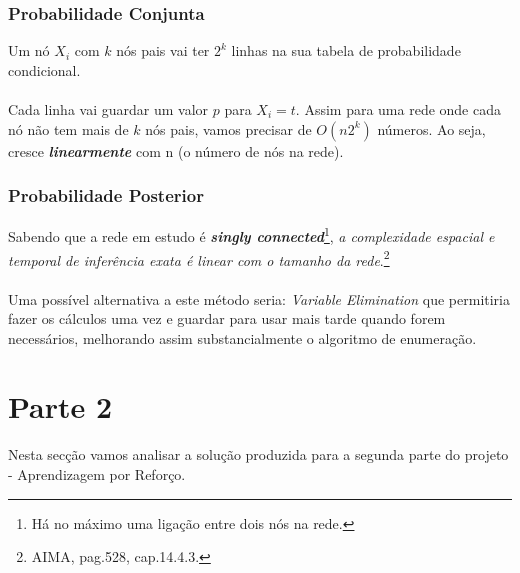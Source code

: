 \documentclass[9pt, a4paper, twocolumn]{article}
\begin{document}
\subsubsection{Probabilidade Conjunta}
Um nó $X_{i}$ com $k$ nós pais vai ter $2^k$ linhas na sua
tabela de probabilidade condicional.\\
\\
Cada linha vai guardar um valor $p$ para $X_{i}=t$. Assim para uma rede onde
 cada nó não tem mais de $k$ nós pais, vamos precisar de $O(n2^k)$ números.
Ao seja, cresce \textbf{\emph{linearmente}} com n (o número de nós na rede).
\subsubsection{Probabilidade Posterior}
Sabendo que a rede em estudo é \textit{\textbf{singly connected}}\footnote{Há no máximo uma ligação entre dois nós na rede.}, \textit{a complexidade espacial e temporal de inferência exata é linear com o tamanho da rede}.\footnote{AIMA, pag.528, cap.14.4.3.}\\\\
Uma possível alternativa a este método seria: \textit{Variable Elimination} que permitiria fazer os cálculos uma vez e guardar para usar mais tarde quando forem necessários, melhorando assim substancialmente o algoritmo de enumeração.

\section{Parte 2}
\hspace{10mm}Nesta secção vamos analisar a solução produzida para a segunda parte do projeto - Aprendizagem por Reforço.
\end{document}
